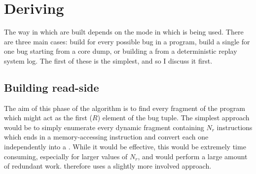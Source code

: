 
\section{Deriving \StateMachines}

The way in which \StateMachines{} are built depends on the mode in
which \technique{} is being used.  There are three main cases: build
\StateMachines{} for every possible bug in a program, build a single
\StateMachine{} for one bug starting from a core dump, or building a
\StateMachine{} from a deterministic replay system log.  The first of
these is the simplest, and so I discuss it first.

\subsection{Building read-side \StateMachines}

The aim of this phase of the algorithm is to find every fragment of
the program which might act as the first ($R$) element of the bug
tuple.  The simplest approach would be to simply enumerate every
dynamic fragment containing $N_r$ instructions which ends in a
memory-accessing instruction and convert each one independently into a
\StateMachine.  While it would be effective, this would be extremely
time consuming, especially for larger values of $N_r$, and would
perform a large amount of redundant work.  \Technique{} therefore uses a
slightly more involved approach.

